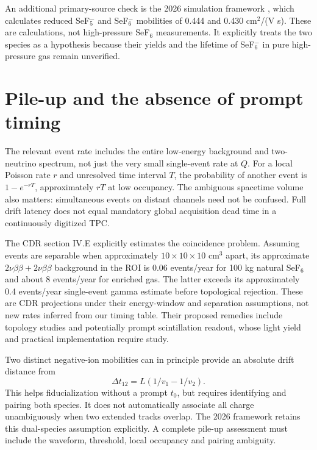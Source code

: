 \documentclass[11pt,a4paper]{article}
\begin{document}
An additional primary-source check is the 2026 simulation framework
\cite{Liang2026NvDExSimulation}, which calculates reduced SeF$_5^-$ and
SeF$_6^-$ mobilities of 0.444 and 0.430 cm$^2$/(V s). These are calculations,
not high-pressure SeF$_6$ measurements. It explicitly treats the two species
as a hypothesis because their yields and the lifetime of SeF$_6^-$ in pure
high-pressure gas remain unverified.

\section{Pile-up and the absence of prompt timing}
The relevant event rate includes the entire low-energy background and
two-neutrino spectrum, not just the very small single-event rate at $Q$.
For a local Poisson rate $r$ and unresolved time interval $T$, the probability
of another event is $1-e^{-rT}$, approximately $rT$ at low occupancy.
The ambiguous spacetime volume also matters: simultaneous events on distant
channels need not be confused. Full drift latency does not equal mandatory
global acquisition dead time in a continuously digitized TPC.

The CDR section IV.E explicitly estimates the coincidence problem. Assuming
events are separable when approximately $10\times10\times10$ cm$^3$ apart,
its approximate $2\nu\beta\beta+2\nu\beta\beta$ background in the ROI is
0.06 events/year for 100 kg natural SeF$_6$ and about 8 events/year for
enriched gas. The latter exceeds its approximately 0.4 events/year
single-event gamma estimate before topological rejection. These are CDR
projections under their energy-window and separation assumptions, not new
rates inferred from our timing table. Their proposed remedies include
topology studies and potentially prompt scintillation readout, whose light
yield and practical implementation require study.

Two distinct negative-ion mobilities can in principle provide an absolute
drift distance from
\begin{equation}
 \Delta t_{12}=L(1/v_1-1/v_2).
\end{equation}
This helps fiducialization without a prompt $t_0$, but requires identifying
and pairing both species. It does not automatically associate all charge
unambiguously when two extended tracks overlap. The 2026 framework retains
this dual-species assumption explicitly. A complete pile-up assessment must
include the waveform, threshold, local occupancy and pairing ambiguity.
\end{document}
